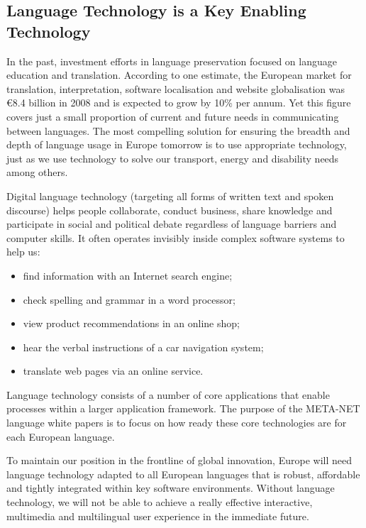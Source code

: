 \begin{multicols}{2}
\subsection{Language Technology is a Key Enabling Technology}
In the past, investment efforts in language preservation focused on language education and translation. According to one estimate, the European market for translation, interpretation, software localisation and website globalisation was €8.4 billion\cite{f1} in 2008 and is expected to grow by 10\% per annum.\cite{EC3} Yet this figure covers just a small proportion of current and future needs in communicating between languages. The most compelling solution for ensuring the breadth and depth of language usage in Europe tomorrow is to use appropriate technology, just as we use technology to solve our transport, energy and disability needs among others.

Digital language technology (targeting all forms of written text and spoken discourse) helps people collaborate, conduct business, share knowledge and participate in social and political debate regardless of language barriers and computer skills. It often operates invisibly inside complex software systems to help us:

\begin{itemize}
\item find information with an Internet search engine;
\item check spelling and grammar in a word processor;
\item view product recommendations in an online shop;
\item hear the verbal instructions of a car navigation system;
\item translate web pages via an online service.
\end{itemize}

Language technology consists of a number of core applications that enable processes within a larger application framework. The purpose of the META-NET language white papers is to focus on how ready these core technologies are for each European language.

To maintain our position in the frontline of global innovation, Europe will need language technology adapted to all European languages that is robust, affordable and tightly integrated within key software environments. Without language technology, we will not be able to achieve a really effective interactive, multimedia and multilingual user experience in the immediate future. 


\end{multicols}
